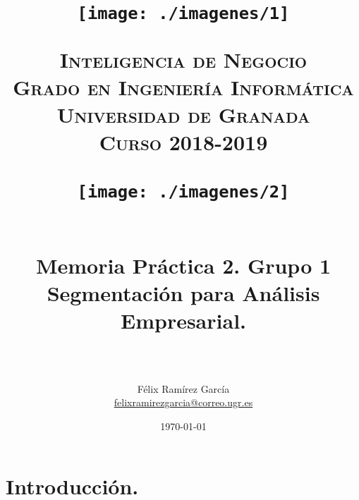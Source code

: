
\usepackage{url}

\title{	
	\normalfont \normalsize
	\begin{figure}[htb]
		\centering
		\texttt{[image: ./imagenes/1]}
	\end{figure}
	\textsc{\textbf{Inteligencia de Negocio} \\ Grado en Ingeniería Informática \\ Universidad de Granada \\
	Curso 2018-2019} \\ [25pt] %
	\begin{figure}[htb]
		\centering
		\texttt{[image: ./imagenes/2]}
	\end{figure}
	\horrule{0.5pt} \\[0.4cm] %
	\huge Memoria Práctica 2. Grupo 1 \\
	\huge Segmentación para Análisis Empresarial.
	\\ %
	\horrule{2pt} \\[0.5cm] %
}
\author{Félix Ramírez García  \\
\href{mailto:felixramirezgarcia@correo.ugr.es}{felixramirezgarcia@correo.ugr.es}} %
\date{\normalsize\today} %



	
	\maketitle %
	
	\newpage %
	
	\tableofcontents %
	
	\listoffigures %
	
	\listoftables %
	
	\newpage

	
	\section[Introducción]{Introducción.}

